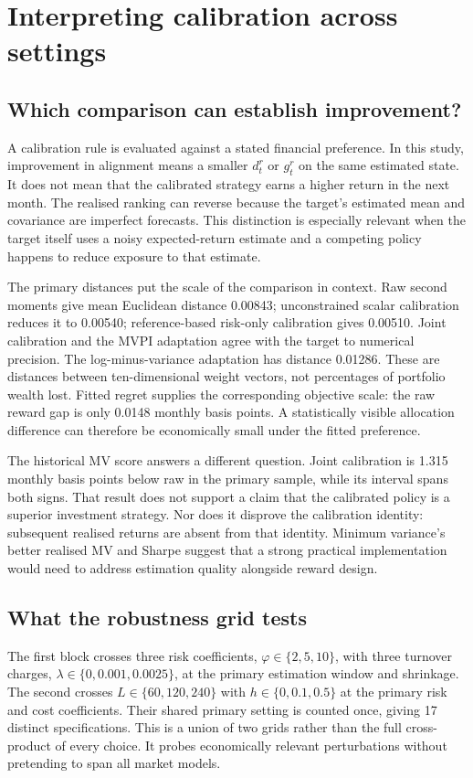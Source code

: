 \documentclass[sigconf,anonymous,review]{acmart}
\begin{document}
\section{Interpreting calibration across settings}
\subsection{Which comparison can establish improvement?}
A calibration rule is evaluated against a stated financial preference. In this study, improvement in alignment means a smaller $d_t^r$ or $g_t^r$ on the same estimated state. It does not mean that the calibrated strategy earns a higher return in the next month. The realised ranking can reverse because the target's estimated mean and covariance are imperfect forecasts. This distinction is especially relevant when the target itself uses a noisy expected-return estimate and a competing policy happens to reduce exposure to that estimate.

The primary distances put the scale of the comparison in context. Raw second moments give mean Euclidean distance 0.00843; unconstrained scalar calibration reduces it to 0.00540; reference-based risk-only calibration gives 0.00510. Joint calibration and the MVPI adaptation agree with the target to numerical precision. The log-minus-variance adaptation has distance 0.01286. These are distances between ten-dimensional weight vectors, not percentages of portfolio wealth lost. Fitted regret supplies the corresponding objective scale: the raw reward gap is only 0.0148 monthly basis points. A statistically visible allocation difference can therefore be economically small under the fitted preference.

The historical MV score answers a different question. Joint calibration is 1.315 monthly basis points below raw in the primary sample, while its interval spans both signs. That result does not support a claim that the calibrated policy is a superior investment strategy. Nor does it disprove the calibration identity: subsequent realised returns are absent from that identity. Minimum variance's better realised MV and Sharpe suggest that a strong practical implementation would need to address estimation quality alongside reward design.

\subsection{What the robustness grid tests}
The first block crosses three risk coefficients, $\varphi\in\{2,5,10\}$, with three turnover charges, $\lambda\in\{0,0.001,0.0025\}$, at the primary estimation window and shrinkage. The second crosses $L\in\{60,120,240\}$ with $h\in\{0,0.1,0.5\}$ at the primary risk and cost coefficients. Their shared primary setting is counted once, giving 17 distinct specifications. This is a union of two grids rather than the full cross-product of every choice. It probes economically relevant perturbations without pretending to span all market models.
\end{document}
